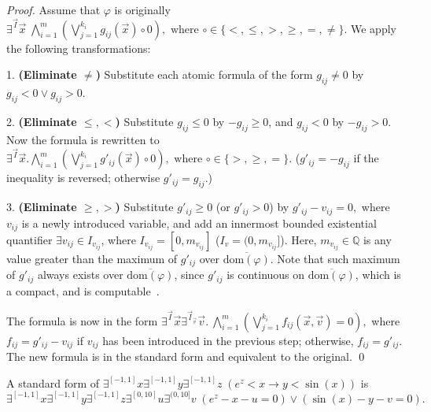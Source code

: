 \documentclass[envcountsect]{llncs}
\newcommand{\dom}{\mathrm{dom}}
\begin{document}
\begin{proof}
Assume that $\varphi$ is originally $\exists^{\vec I}\vec x\;\bigwedge_{i=1}^m (\bigvee_{j=1}^{k_i} g_{ij}(\vec x)\circ 0), \mbox{ where }\circ\in\{<,\leq, >, \geq, =,\neq\}.$ We apply the following transformations:

1. {\bf (Eliminate $\neq$)} Substitute each atomic formula of the form $g_{ij}\neq 0$ by $g_{ij}<0\vee g_{ij}>0$.

2. {\bf (Eliminate $\leq, <$)} Substitute $g_{ij}\leq 0$ by $-g_{ij}\geq 0$, and $g_{ij}<0$ by $-g_{ij}>0$. Now the formula is rewritten to $\exists^{\vec I}\vec x. \bigwedge_{i=1}^m (\bigvee_{j=1}^{k_i} g'_{ij}(\vec x)\circ 0), \mbox{ where } \circ\in\{>, \geq, = \}.$ ($g'_{ij} = -g_{ij}$ if the inequality is reversed; otherwise $g'_{ij}=g_{ij}$.)

3. {\bf (Eliminate $\geq, >$)} Substitute $g'_{ij}\geq 0$ (or $g'_{ij}>0$) by $g'_{ij}-v_{ij}=0,$ where $v_{ij}$ is a newly introduced variable, and add an innermost bounded existential quantifier $\exists v_{ij}\in I_{v_{ij}}$, where $I_{v_{ij}} = [0, m_{v_{ij}}]$ ($I_v=(0,m_{v_{ij}}]$). Here, $m_{v_{ij}}\in \mathbb{Q}$ is any value greater than the maximum of $g'_{ij}$ over $\overline{\dom(\varphi)}$. Note that such maximum of $g'_{ij}$ always exists over $\overline{\dom(\varphi)}$, since $g'_{ij}$ is continuous on $\overline{\dom(\varphi)}$, which is a compact, and is computable~\cite{Kobook}. 

The formula is now in the form $\exists^{\vec I}\vec x\exists^{\vec I_{\vec v}} \vec v.\ \bigwedge_{i=1}^m (\bigvee_{j=1}^{k_i} f_{ij}(\vec x, \vec v)=0),$ where $f_{ij} = g'_{ij}-v_{ij}$ if $v_{ij}$ has been introduced in the previous step; otherwise, $f_{ij} = g'_{ij}$. The new formula is in the standard form and equivalent to the original.
\qed\end{proof}
\begin{example}
A standard form of $\exists^{[-1,1]} x\exists^{[-1,1]} y\exists^{[-1,1]} z\;(e^z<x\rightarrow y<\sin(x))$ is $\exists^{[-1,1]} x\exists^{[-1,1]} y \exists^{[-1,1]} z \exists^{[0, 10]} u \exists^{(0,10]} v\;(e^z- x - u = 0) \vee (\sin(x)- y - v = 0).$
\end{example}
\end{document}
